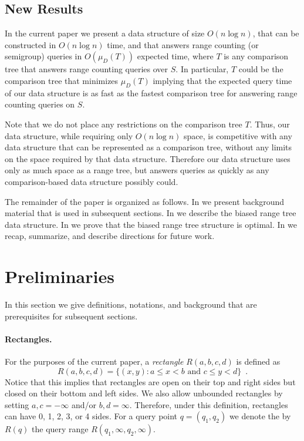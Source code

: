 \documentclass[lotsofwhite,charterfonts]{patmorin}
\begin{document}
\subsection{New Results}

In the current paper we present a data structure of size $O(n\log n)$,
that can be constructed in $O(n\log n)$ time, and that answers range
counting (or semigroup) queries in $O(\mu_D(T))$ expected time, where
$T$ is any comparison tree that answers range counting queries over $S$.
In particular, $T$ could be the comparison tree that minimizes
$\mu_D(T)$ implying that the expected query time of our data structure
is as fast as the fastest comparison tree for answering range counting
queries on $S$.

Note that we do not place any restrictions on the comparison tree $T$.
Thus, our data structure, while requiring only $O(n\log n)$ space, is
competitive with any data structure that can be represented as a
comparison tree, without any limits on the space required by that data
structure.  Therefore our data structure uses only as much space as a
range tree, but answers queries as quickly as any comparison-based
data structure possibly could.


The remainder of the paper is organized as follows. In
 we present background material that is used in
subsequent sections.  In  we describe the
biased range tree data structure.  In  we prove
that the biased range tree structure is optimal.  In 
we recap, summarize, and describe directions for future work.

\section{Preliminaries}


In this section we give definitions, notations, and background
that are prerequisites for subsequent sections.

\paragraph{Rectangles.}

For the purposes of the current paper, a \emph{rectangle} 
$R(a,b,c,d)$ is defined as
\[
    R(a,b,c,d) = \{ (x,y) : \mbox{$a\le x < b$ and $c \le y < d$}\}
	\enspace .
\]
Notice that this implies that rectangles are open on their top and
right sides but closed on their bottom and left sides.  We also allow
unbounded rectangles by setting $a,c=-\infty$ and/or $b,d=\infty$.
Therefore, under this definition, rectangles can have 0, 1, 2, 3, or 4
sides.  For a query point $q=(q_1,q_2)$ we denote the by $R(q)$ the
query range $R(q_1,\infty,q_2,\infty)$.
\end{document}
